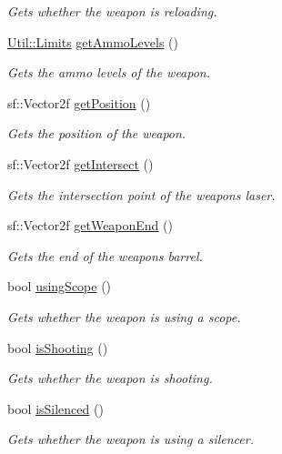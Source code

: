 \begin{DoxyCompactItemize}
\begin{DoxyCompactList}\small\item\em Gets whether the weapon is reloading. \end{DoxyCompactList}\item 
\hyperlink{struct_util_1_1_limits}{Util\+::\+Limits} \hyperlink{class_weapon_a834032aeb0af1f9226c7358b7567ded2}{get\+Ammo\+Levels} ()
\begin{DoxyCompactList}\small\item\em Gets the ammo levels of the weapon. \end{DoxyCompactList}\item 
sf\+::\+Vector2f \hyperlink{class_weapon_a6457c3af859075380b04e7a1a07f1359}{get\+Position} ()
\begin{DoxyCompactList}\small\item\em Gets the position of the weapon. \end{DoxyCompactList}\item 
sf\+::\+Vector2f \hyperlink{class_weapon_a35a7c4790ffd0f77a4de0baa752c6cac}{get\+Intersect} ()
\begin{DoxyCompactList}\small\item\em Gets the intersection point of the weapons laser. \end{DoxyCompactList}\item 
sf\+::\+Vector2f \hyperlink{class_weapon_aab3dab9bb65fc9797e3d30dcd848b4a8}{get\+Weapon\+End} ()
\begin{DoxyCompactList}\small\item\em Gets the end of the weapons barrel. \end{DoxyCompactList}\item 
bool \hyperlink{class_weapon_a5cc98ecbbf1b8132abe99df8871f0d33}{using\+Scope} ()
\begin{DoxyCompactList}\small\item\em Gets whether the weapon is using a scope. \end{DoxyCompactList}\item 
bool \hyperlink{class_weapon_a50f8c0a7b18e6ef0aa01c2d076561148}{is\+Shooting} ()
\begin{DoxyCompactList}\small\item\em Gets whether the weapon is shooting. \end{DoxyCompactList}\item 
bool \hyperlink{class_weapon_ab81bbc103829e1abc5e898b583c6d179}{is\+Silenced} ()
\begin{DoxyCompactList}\small\item\em Gets whether the weapon is using a silencer. \end{DoxyCompactList}\end{DoxyCompactItemize}
